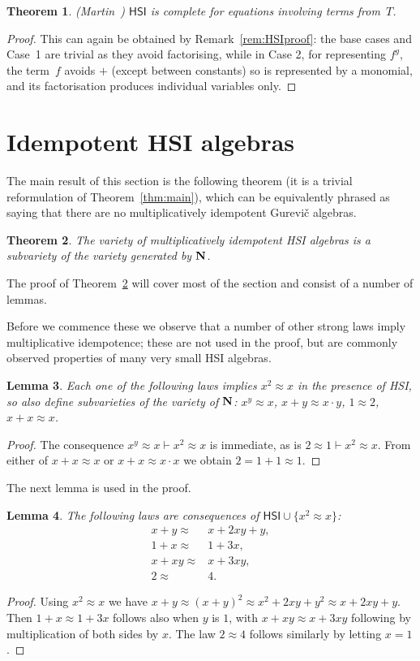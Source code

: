 \documentclass[eqnor,reqno]{amsart}
\theoremstyle{plain}
\newtheorem{thm}{Theorem}[section]
\newtheorem{lem}[thm]{Lemma}
\theoremstyle{definition}
\newcommand{\up}[1]{\textup{#1}}
\newcommand{\HSI}{\textsf{HSI}}
\begin{document}
\begin{thm} \up(Martin~\cite[Theorems 4 and 1.50]{mar}\up)
$\HSI$  is complete for equations involving terms from~$T$.
\end{thm}
\begin{proof}
This can again be obtained by Remark~\ref{rem:HSIproof}: the base cases and Case~1 are trivial as they avoid factorising, while in Case 2, for representing $f^g$, the term~$f$ avoids $+$ (except between constants) so is represented by a monomial, and its factorisation produces individual variables only.
\end{proof}




\section{Idempotent HSI algebras}\label{sec:idempotent}
The main result of this section is the following theorem (it is a trivial reformulation of Theorem~\ref{thm:main}), which can be equivalently phrased as saying that there are no multiplicatively idempotent Gurevi\v{c} algebras.
\begin{thm}\label{thm:x2x}
The variety of multiplicatively idempotent HSI algebras is a subvariety of the variety generated by ${\bf N}$.
\end{thm}
The proof of Theorem~\ref{thm:x2x} will cover most of the section and consist of a number of lemmas.  

Before we commence these we observe that a number of other strong laws imply multiplicative idempotence; these are not used in the proof, but are commonly observed properties of many very small HSI algebras. 
\begin{lem}
Each one of the following laws implies $x^2\approx x$ in the presence of \HSI, so also define subvarieties of the variety of ${\bf N}$\up: $x^y\approx x$, $x+y\approx x\cdot y$, $1\approx 2$, $x+x\approx x$.
\end{lem}
\begin{proof}
The consequence $x^y\approx x\vdash x^2\approx x$ is immediate, as is $2\approx 1\vdash x^2\approx x$.  From either of $x+x\approx x$ or $x+x\approx x\cdot x$ we obtain $2=1+1\approx 1$.
\end{proof}

The next lemma is used in the proof.
\begin{lem}\label{lem:x2x}
The following laws are consequences of $\HSI\cup\{x^2\approx x\}$\up:
\begin{align*}
x+y\approx {}&x+2xy +y,\\
1+x\approx {}& 1+3x,\\
x+xy\approx{}& x+3xy,\\
2\approx{}& 4.
\end{align*}
\end{lem}
\begin{proof}
Using $x^2\approx x$ we have $x+y\approx (x+y)^2\approx x^2+2xy+y^2\approx x+2xy+y$.  Then $1+x\approx 1+3x$ follows also when $y$ is $1$, with $x+xy\approx x+3xy$ following by multiplication of both sides by $x$.  The law $2\approx 4$ follows similarly by letting $x=1$.
\end{proof}
\end{document}

